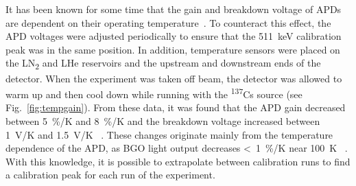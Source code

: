 \documentclass[oneside,12pt]{memoir}
\begin{document}
It has been known for some time that the gain and breakdown voltage of APDs are dependent on their operating temperature~\cite{moszynski03}. To counteract this effect, the APD voltages were adjusted periodically to ensure that the 511~keV calibration peak was in the same position. In addition, temperature sensors were placed on the LN\textsubscript{2} and LHe reservoirs and the upstream and downstream ends of the detector. When the experiment was taken off beam, the detector was allowed to warm up and then cool down while running with the \textsuperscript{137}Cs source (see Fig.~\ref{fig:tempgain}). From these data, it was found that the APD gain decreased between 5~\%/K and 8~\%/K and the breakdown voltage increased between 1~V/K and 1.5~V/K ~\cite{Cooper201264}. These changes originate mainly from the temperature dependence of the APD, as BGO light output decreases <~1~\%/K near 100~K ~\cite{gironnet08}. With this knowledge, it is possible to extrapolate between calibration runs to find a calibration peak for each run of the experiment.
\end{document}
